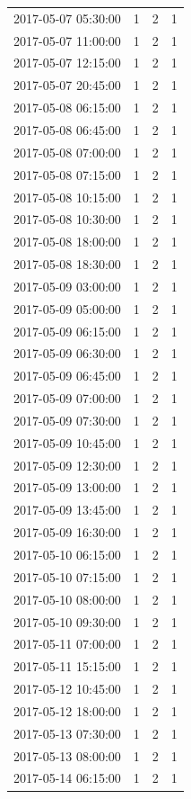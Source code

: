 \begin{tabular}{lrrr}
2017-05-07 05:30:00 & 1 & 2 & 1 \\
2017-05-07 11:00:00 & 1 & 2 & 1 \\
2017-05-07 12:15:00 & 1 & 2 & 1 \\
2017-05-07 20:45:00 & 1 & 2 & 1 \\
2017-05-08 06:15:00 & 1 & 2 & 1 \\
2017-05-08 06:45:00 & 1 & 2 & 1 \\
2017-05-08 07:00:00 & 1 & 2 & 1 \\
2017-05-08 07:15:00 & 1 & 2 & 1 \\
2017-05-08 10:15:00 & 1 & 2 & 1 \\
2017-05-08 10:30:00 & 1 & 2 & 1 \\
2017-05-08 18:00:00 & 1 & 2 & 1 \\
2017-05-08 18:30:00 & 1 & 2 & 1 \\
2017-05-09 03:00:00 & 1 & 2 & 1 \\
2017-05-09 05:00:00 & 1 & 2 & 1 \\
2017-05-09 06:15:00 & 1 & 2 & 1 \\
2017-05-09 06:30:00 & 1 & 2 & 1 \\
2017-05-09 06:45:00 & 1 & 2 & 1 \\
2017-05-09 07:00:00 & 1 & 2 & 1 \\
2017-05-09 07:30:00 & 1 & 2 & 1 \\
2017-05-09 10:45:00 & 1 & 2 & 1 \\
2017-05-09 12:30:00 & 1 & 2 & 1 \\
2017-05-09 13:00:00 & 1 & 2 & 1 \\
2017-05-09 13:45:00 & 1 & 2 & 1 \\
2017-05-09 16:30:00 & 1 & 2 & 1 \\
2017-05-10 06:15:00 & 1 & 2 & 1 \\
2017-05-10 07:15:00 & 1 & 2 & 1 \\
2017-05-10 08:00:00 & 1 & 2 & 1 \\
2017-05-10 09:30:00 & 1 & 2 & 1 \\
2017-05-11 07:00:00 & 1 & 2 & 1 \\
2017-05-11 15:15:00 & 1 & 2 & 1 \\
2017-05-12 10:45:00 & 1 & 2 & 1 \\
2017-05-12 18:00:00 & 1 & 2 & 1 \\
2017-05-13 07:30:00 & 1 & 2 & 1 \\
2017-05-13 08:00:00 & 1 & 2 & 1 \\
2017-05-14 06:15:00 & 1 & 2 & 1 \\

\end{tabular}
